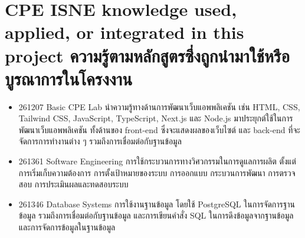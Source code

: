 \section{\ifenglish%
      \ifcpe CPE \else ISNE \fi knowledge used, applied, or integrated in this project
  \else%
      ความรู้ตามหลักสูตรซึ่งถูกนำมาใช้หรือบูรณาการในโครงงาน
  \fi
 }

\begin{itemize}
    \item 261207 Basic CPE Lab นําความรู้ทางด้านการพัฒนาเว็บแอพพลิเคชัน เช่น HTML, CSS, Tailwind CSS, JavaScript, TypeScript, Next.js
          และ Node.js มาประยุกต์ใช้ในการพัฒนาเว็บแอพพลิเคชัน ทั้งด้านของ front-end ซึ่งจะแสดงผลของเว็บไซต์ และ back-end ที่จะจัดการการทำงานต่าง ๆ รวมถึงการเชื่อมต่อกับฐานข้อมูล
    \item 261361 Software Engineering การใช้กระบวนการทางวิศวกรรมในการดูแลการผลิต ตั้งแต่การเริ่มเก็บความต้องการ การตั้งเป้าหมายของระบบ การออกแบบ กระบวนการพัฒนา การตรวจสอบ การประเมินผลและทดสอบระบบ
    \item 261346 Database Systems การใช้งานฐานข้อมูล โดยใช้ PostgreSQL ในการจัดการฐานข้อมูล รวมถึงการเชื่อมต่อกับฐานข้อมูล
          และการเขียนคำสั่ง SQL ในการดึงข้อมูลจากฐานข้อมูลและการจัดการข้อมูลในฐานข้อมูล

\end{itemize}



